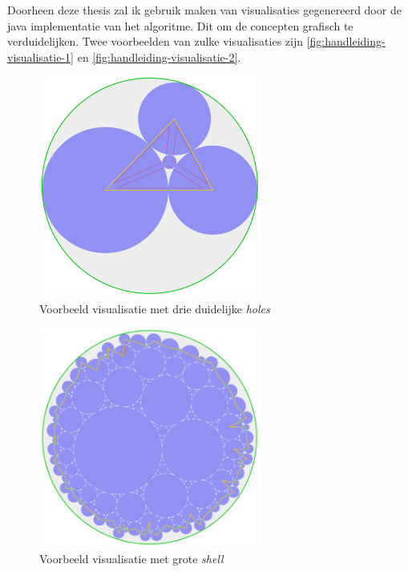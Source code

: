 \documentclass[12pt,a4paper,oneside]{book}
\begin{document}
Doorheen deze thesis zal ik gebruik maken van visualisaties gegenereerd door de java implementatie van het algoritme.
Dit om de concepten grafisch te verduidelijken.
Twee voorbeelden van zulke visualisaties zijn \autoref{fig:handleiding-visualisatie-1} en \autoref{fig:handleiding-visualisatie-2}.

\begin{figure}
  \centering
  \includegraphics[width=0.65\textwidth]{handleiding-visualisatie-1.png}
  \caption{Voorbeeld visualisatie met drie duidelijke \textit{holes}} \label{fig:handleiding-visualisatie-1}
\end{figure}

\begin{figure}
  \centering
  \includegraphics[width=0.65\textwidth]{handleiding-visualisatie-2.png}
  \caption{Voorbeeld visualisatie met grote \textit{shell}} \label{fig:handleiding-visualisatie-2}
\end{figure}
\end{document}
